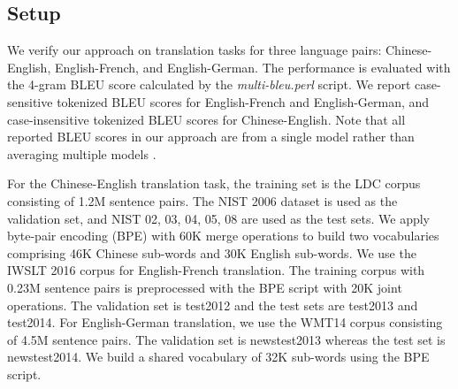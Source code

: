 \documentclass[11pt,a4paper]{article}
\begin{document}
\subsection{Setup}
We verify our approach on translation tasks for three language pairs: Chinese-English, English-French, and English-German. 
The performance is evaluated with the 4-gram BLEU score \cite{Papineni:02} calculated by the {\em multi-bleu.perl} script. We report case-sensitive tokenized BLEU scores for English-French and  English-German, and case-insensitive tokenized BLEU scores for Chinese-English.
Note that all reported BLEU scores in our approach are from a single model rather than averaging multiple models \cite{Vaswani:17}.

For the Chinese-English translation task, the training set is the LDC corpus consisting of 1.2M sentence pairs. 
The NIST 2006 dataset is used as the validation set, and NIST 02, 03, 04, 05, 08 are used as the test sets.
We apply byte-pair encoding (BPE) \cite{Sennrich:16a} with 60K merge operations to build two vocabularies comprising 46K Chinese sub-words and 30K English sub-words.
We use the IWSLT 2016 corpus for English-French translation. The training corpus with 0.23M sentence pairs is preprocessed with the BPE script with 20K joint operations. The validation set is test2012 and the test sets are test2013 and test2014. For English-German translation, we use the WMT14 corpus consisting of 4.5M sentence pairs. The validation set is newstest2013 whereas the test set is newstest2014. We build a shared vocabulary of 32K sub-words using the BPE script.
\end{document}
